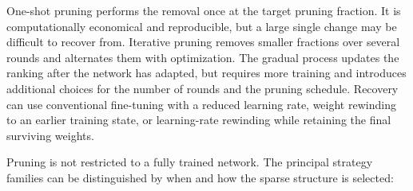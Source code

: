 \documentclass[
    a4paper,
    12pt,
    titlepage,
    bibliography=totoc,
    twoside=on,
    parskip=false,
    numbers=noenddot,
    cleardoublepage=empty,
    DIV=12,
    BCOR=12.0mm,
    headheight=36pt,
    headings=openright
]{scrreprt}
\begin{document}
One-shot pruning performs the removal once at the target pruning fraction. It is computationally economical and reproducible, but a large single change may be difficult to recover from. Iterative pruning removes smaller fractions over several rounds and alternates them with optimization. The gradual process updates the ranking after the network has adapted, but requires more training and introduces additional choices for the number of rounds and the pruning schedule. Recovery can use conventional fine-tuning with a reduced learning rate, weight rewinding to an earlier training state, or learning-rate rewinding while retaining the final surviving weights.\autocite{frankleLotteryTicketHypothesis2019,rendaComparingRewinding2020}

Pruning is not restricted to a fully trained network. The principal strategy families can be distinguished by when and how the sparse structure is selected:
\end{document}
